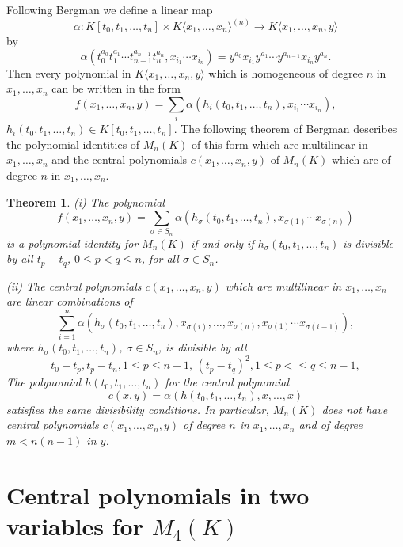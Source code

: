 \documentclass[12pt]{amsart}
\newtheorem{theorem}{Theorem}[section]
\theoremstyle{definition}
\begin{document}
Following Bergman \cite{Berg} we define a linear map
\[
\alpha:K[t_0,t_1,\ldots,t_n]\times K\langle x_1,\ldots,x_n\rangle^{(n)}\to K\langle x_1,\ldots,x_n,y\rangle
\]
by
\[
\alpha(t_0^{a_0}t_1^{a_1}\cdots t_{n-1}^{a_{n-1}}t_n^{a_n},x_{i_1}\cdots x_{i_n})=y^{a_0}x_{i_1}y^{a_1}\cdots y^{a_{n-1}}x_{i_n}y^{a_n}.
\]
Then every polynomial in $K\langle x_1,\ldots,x_n,y\rangle$ which is homogeneous of degree $n$ in $x_1,\ldots,x_n$ can be written in the form
\[
f(x_1,\ldots,x_n,y)=\sum_i\alpha(h_i(t_0,t_1,\ldots,t_n),x_{i_1}\cdots x_{i_n}),
\]
$h_i(t_0,t_1,\ldots,t_n)\in K[t_0,t_1,\ldots,t_n]$.
The following theorem of Bergman \cite{Berg} describes the polynomial identities of $M_n(K)$ of this form which are multilinear in $x_1,\ldots,x_n$
and the central polynomials $c(x_1,\ldots,x_n,y)$ of $M_n(K)$ which are of degree $n$ in $x_1,\ldots,x_n$.

\begin{theorem}\cite[Part II]{Berg}\label{central polynomials of degree (n,k)}
{\rm (i)} The polynomial
\[
f(x_1,\ldots,x_n,y)=\sum_{\sigma\in S_n}\alpha(h_{\sigma}(t_0,t_1,\ldots,t_n),x_{\sigma(1)}\cdots x_{\sigma(n)})
\]
is a polynomial identity for $M_n(K)$ if and only if $h_{\sigma}(t_0,t_1,\ldots,t_n)$ is divisible by all $t_p-t_q$, $0\leq p<q\leq n$, for all $\sigma\in S_n$.

{\rm(ii)} The central polynomials $c(x_1,\ldots,x_n,y)$ which are multilinear in $x_1,\ldots,x_n$ are linear combinations of
\[
\sum_{i=1}^n\alpha(h_{\sigma}(t_0,t_1,\ldots,t_n),x_{\sigma(i)},\ldots,x_{\sigma(n)},x_{\sigma(1)}\cdots x_{\sigma(i-1)}),
\]
where $h_{\sigma}(t_0,t_1,\ldots,t_n)$, $\sigma\in S_n$, is divisible by all
\[
t_0-t_p, t_p-t_n,1\leq p\leq n-1,\,(t_p-t_q)^2, 1\leq p<\leq q\leq n-1,
\]
The polynomial $h(t_0,t_1,\ldots,t_n)$ for the central polynomial
\[
c(x,y)=\alpha(h(t_0,t_1,\ldots,t_n),x,\ldots,x)
\]
satisfies the same divisibility conditions.
In particular, $M_n(K)$ does not have central polynomials $c(x_1,\ldots,x_n,y)$ of degree $n$ in $x_1,\ldots,x_n$ and of degree $m<n(n-1)$ in $y$.
\end{theorem}

\section{Central polynomials in two variables for $M_4(K)$}\label{section 4}
\end{document}
